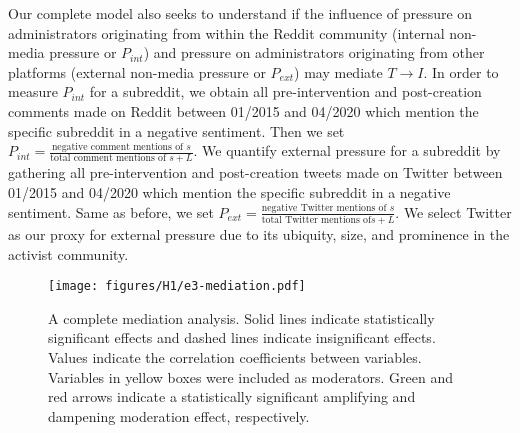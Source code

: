  Our complete model also seeks to
understand if the influence of pressure on administrators originating from within
the Reddit community (internal non-media pressure or $P_{int}$) and pressure on
administrators originating from other platforms (external non-media pressure or
$P_{ext}$) may mediate $T\rightarrow I$. In order to measure $P_{int}$ for
a subreddit, we obtain all pre-intervention and post-creation comments made on
Reddit between 01/2015 and 04/2020 which mention the specific subreddit in
a negative sentiment. Then we set $P_{int} = \frac{\text{negative comment
mentions of }s}{\text{total comment mentions of }s+L}$. We quantify external
pressure for a subreddit by gathering all pre-intervention and post-creation
tweets made on Twitter between 01/2015 and 04/2020 which mention the specific
subreddit in a negative sentiment. Same as before, we set $P_{ext}
= \frac{\text{negative Twitter mentions of }s}{\text{total Twitter mentions of
}s+L}$. We select Twitter as our proxy for external pressure due to its
ubiquity, size, and prominence in the activist community. 

\begin{figure}[t]
    \centering
    \texttt{[image: figures/H1/e3-mediation.pdf]}
    \caption{A complete mediation analysis. Solid
    lines indicate statistically significant effects and dashed lines indicate
    insignificant effects. Values indicate the correlation coefficients between
    variables. Variables in yellow boxes were included as moderators. Green
    and red arrows indicate a statistically significant amplifying and
    dampening moderation effect, respectively.}
    \label{figure:relationship:e3mediation}
\end{figure}

